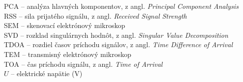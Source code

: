 PCA -- analýza hlavných komponentov, z angl. \emph{\foreignlanguage{english}{Principal Component Analysis}}\\
RSS -- sila prijatého signálu, z angl. \emph{\foreignlanguage{english}{Received Signal Strength}}\\
SEM -- skenovací elektrónový mikroskop\\
SVD -- rozklad singulárnych hodnôt, z angl. \emph{\foreignlanguage{english}{Singular Value Decomposition}}\\
TDOA -- rozdiel časov príchodu signálov, z angl. \emph{\foreignlanguage{english}{Time Difference of Arrival}}\\
TEM -- transmisný elektrónový mikroskop\\
TOA -- čas príchodu signálu, z angl. \emph{\foreignlanguage{english}{Time of Arrival}}\\
$U$ -- elektrické napätie (V)

